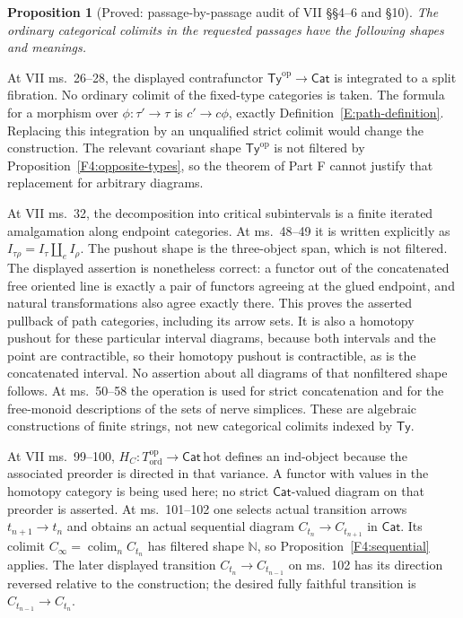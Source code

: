\documentclass[11pt,a4paper]{article}
\newtheorem{proposition}[theorem]{Proposition}
\theoremstyle{definition}
\theoremstyle{remark}
\begin{document}
\begin{proposition}[Proved: passage-by-passage audit of VII \S\S4--6
and \S10]\label{F4:passages}
The ordinary categorical colimits in the requested passages have the
following shapes and meanings.
\end{proposition}

At VII ms.~26--28, the displayed contrafunctor
$\mathsf{Ty}^{\mathrm{op}}\to\mathsf{Cat}$ is integrated to a split
fibration.  No ordinary colimit of the fixed-type categories is taken.
The formula for a morphism over $\phi:\tau'\to\tau$ is
$c'\to c\phi$, exactly Definition~\ref{E:path-definition}.
Replacing this integration by an unqualified strict colimit would
change the construction.  The relevant covariant shape
$\mathsf{Ty}^{\mathrm{op}}$ is not filtered by
Proposition~\ref{F4:opposite-types}, so the theorem of Part F cannot
justify that replacement for arbitrary diagrams.

At VII ms.~32, the decomposition into critical subintervals is a finite
iterated amalgamation along endpoint categories.  At ms.~48--49 it is
written explicitly as
$I_{\tau\rho}=I_\tau\amalg_e I_\rho$.  The pushout shape is the
three-object span, which is not filtered.  The displayed assertion is
nonetheless correct: a functor out of the concatenated free oriented
line is exactly a pair of functors agreeing at the glued endpoint,
and natural transformations also agree exactly there.  This proves
the asserted pullback of path categories, including its arrow sets.
It is also a homotopy pushout for these particular interval diagrams,
because both intervals and the point are contractible, so their
homotopy pushout is contractible, as is the concatenated interval.
No assertion about all diagrams of that nonfiltered shape follows.
At ms.~50--58 the operation is used for strict concatenation and for
the free-monoid descriptions of the sets of nerve simplices.  These
are algebraic constructions of finite strings, not new categorical
colimits indexed by $\mathsf{Ty}$.

At VII ms.~99--100, $H_C:T_{\mathrm{ord}}^{\mathrm{op}}\to
\mathsf{Cat}\,\mathrm{hot}$ defines an ind-object because the
associated preorder is directed in that variance.  A functor with
values in the homotopy category is being used here; no strict
$\mathsf{Cat}$-valued diagram on that preorder is asserted.
At ms.~101--102 one selects actual transition arrows
$t_{n+1}\to t_n$ and obtains an actual sequential diagram
$C_{t_n}\to C_{t_{n+1}}$ in $\mathsf{Cat}$.  Its colimit
$C_\infty=\operatorname{colim}_n C_{t_n}$ has filtered shape
$\mathbb N$, so Proposition~\ref{F4:sequential} applies.
The later displayed transition $C_{t_n}\to C_{t_{n-1}}$ on ms.~102
has its direction reversed relative to the construction; the desired
fully faithful transition is $C_{t_{n-1}}\to C_{t_n}$.
\end{document}
